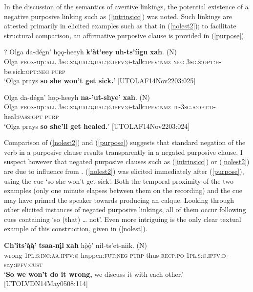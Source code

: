 \documentclass[output=paper,colorlinks,citecolor=brown]{langscibook}
\begin{document}
In the discussion of the semantics of avertive linkings, the potential existence of a negative purposive linking such as (\ref{intrinsicc}) was noted. Such linkings are attested primarily in elicited examples such as that in (\ref{nolest2}); to facilitate structural comparison, an affirmative purposive clause is provided in (\ref{purpose}).

\ea
\label{nolest2}
\gll ? Olga da-dégn' hǫǫ-heeyh \textbf{k'àt'eey} \textbf{uh-ts'íígn} \textbf{xah}. \textnormal{(N)} \\
{} Olga \textsc{prox}-up:\textsc{all} \textsc{3sg.s:qual:qual:ø.ipfv:ø}-talk:\textsc{ipfv:nmz} \textsc{neg} \textsc{3sg.s:opt:h}-be.sick:\textsc{opt:neg} \textsc{purp} \\
\glt `Olga prays \textbf{so she won't get sick.}' \hfill [UTOLAF14Nov2203:025]
\z 

\ea
\label{purpose}
\gll Olga da-dégn' hǫǫ-heeyh \textbf{na-'ut-shye'} \textbf{xah}. \textnormal{(N)} \\
Olga \textsc{prox}-up:\textsc{all} \textsc{3sg.s:qual:qual:ø.ipfv:ø}-talk:\textsc{ipfv:nmz} \textsc{it-3sg.s:opt:d}-heal:\textsc{pass:opt} \textsc{purp} \\
\glt `Olga prays \textbf{so she'll get healed.}' \hfill [UTOLAF14Nov2203:024]
\z 

\noindent Comparison of (\ref{nolest2}) and (\ref{purpose}) suggests that standard negation of the verb in a purposive clause results transparently in a negated purposive clause. I suspect however that negated purposive clauses such as (\ref{intrinsicc}) or (\ref{nolest2}) are due to influence from . (\ref{nolest2}) was elicited immediately after (\ref{purpose}), using the cue `so she won't get sick'. Both the temporal proximity of the two examples (only one minute elapses between them on the recording) and the  cue may have primed the speaker towards producing an  calque. Looking through other elicited instances of negated purposive linkings, all of them occur following cues containing `so (that) {\ldots} not'. Even more intriguing is the only clear textual example of this construction, given in (\ref{nolest}).  

\ea
\label{nolest}
\gll \textbf{Ch'its'ą̀ą̀'} \textbf{tsaa-nį́l} \textbf{xah} hǫ̀ǫ̀' {nił-ts'et-niik. \textnormal{(N)}} \\
wrong \textsc{1pl.s:inc:aa.ipfv:ø}-happen:\textsc{fut:neg} \textsc{purp} thus \textsc{recp.po-1pl.s:ø.ipfv:d}-say:\textsc{ipfv:cust} \\
\glt `\textbf{So we won't do it wrong,} we discuss it with each other.' \\ \hfill [UTOLVDN14May0508:114]
\z 
\end{document}
